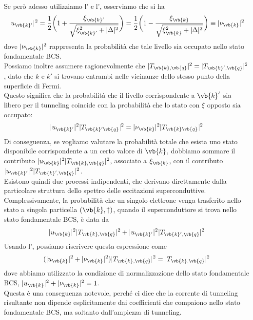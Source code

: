 Se però adesso utilizziamo l' e l', osserviamo che si ha
\begin{equation*}
    |u_{\vb{k}'}|^2
    =\frac{1}{2} \biggl( 1 + \frac{ \xi_{\vb{k}'} }{ \sqrt{ \xi_{\vb{k}'}^2+|\Delta|^2 } } \biggr)
    =\frac{1}{2} \biggl( 1 - \frac{ \xi_{\vb{k}} }{ \sqrt{ \xi_{\vb{k}}^2+|\Delta|^2 } } \biggr)
    \equiv |\nu_{\vb{k}}|^2
\end{equation*}
dove $|\nu_{\vb{k}}|^2$ rappresenta la probabilità che tale livello sia occupato nello stato fondamentale BCS.\\
Possiamo inoltre assumere ragionevolmente che $|T_{\vb{k},\vb{q}}|^2 = |T_{\vb{k}',\vb{q}}|^2$, dato che $k$ e $k'$ si trovano entrambi nelle vicinanze dello stesso punto della superficie di Fermi.\\
Questo significa che la probabilità che il livello corrispondente a $\vb{k}'$ sia libero per il tunneling coincide con la probabilità che lo stato con $\xi$ opposto sia occupato:
\begin{equation}
    |u_{\vb{k}'}|^2
    |T_{\vb{k}'\vb{q}}|^2
    =
    |\nu_{\vb{k}}|^2
    |T_{\vb{k}\vb{q}}|^2
    \label{eq:probability_tunneling_k'}
\end{equation}
Di conseguenza, se vogliamo valutare la probabilità totale che esista uno stato disponibile corrispondente a un certo valore di $\vb{k}$, dobbiamo sommare il contributo $|u_{\vb{k}}|^2 |T_{\vb{k},\vb{q}}|^2$, associato a $\xi_{\vb{k}}$, con il contributo $|u_{\vb{k}'}|^2 |T_{\vb{k}',\vb{q}}|^2$.\\
Esistono quindi due processi indipendenti, che derivano direttamente dalla particolare struttura dello spettro delle eccitazioni superconduttive. Complessivamente, la probabilità che un singolo elettrone venga trasferito nello stato a singola particella $(\vb{k},\uparrow)$, quando il superconduttore si trova nello stato fondamentale BCS, è data da
\begin{equation*}
    |u_{\vb{k}}|^2 |T_{\vb{k},\vb{q}}|^2 + |u_{\vb{k}'}|^2 |T_{\vb{k}',\vb{q}}|^2
\end{equation*}
Usando l', possiamo riscrivere questa espressione come
\begin{equation*}
    ( |u_{\vb{k}}|^2 + |\nu_{\vb{k}}|^2 ) |T_{\vb{k},\vb{q}}|^2
    =|T_{\vb{k},\vb{q}}|^2
\end{equation*}
dove abbiamo utilizzato la condizione di normalizzazione dello stato fondamentale BCS, $|u_{\vb{k}}|^2 + |\nu_{\vb{k}}|^2 = 1$.\\
Questa è una conseguenza notevole, perché ci dice che la corrente di tunneling risultante non dipende esplicitamente dai coefficienti che compaiono nello stato fondamentale BCS, ma soltanto dall'ampiezza di tunneling.
